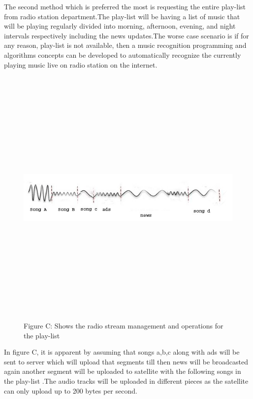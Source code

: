 The second method which is preferred the most is requesting the entire play-list from radio station department.The play-list will be having a list of music that will be playing regularly divided into morning, afternoon, evening, and night intervals respectively including the news updates.The worse case scenario is if for any reason, play-list is not available, then a music recognition programming and algorithms concepts can be developed to automatically recognize the currently playing music live on radio station on the internet.\\
\begin{figure}
\begin{centering}
\includegraphics[width=13cm,height=13cm,keepaspectratio]{Figures/3.jpg}
\caption{Figure C: Shows the radio stream management and operations for the play-list}
\label{radio-transmitter-injection-portal}
\end{centering}
\end{figure} 


In figure C, it is apparent  by assuming that songs a,b,c along with ads will be sent to server  which will upload that segments till then news will be broadcasted  again another segment will be uploaded to satellite with the following songs in the play-list .The audio tracks will be uploaded in different pieces as the satellite can only upload up to 200 bytes per second.\\

